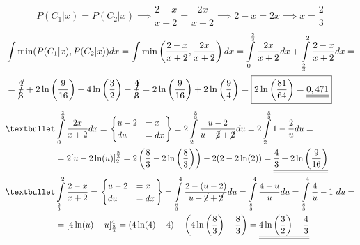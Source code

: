 \documentclass[a4paper]{article}
\begin{document}
$$
P(C_1|x) = P(C_2|x) \implies \frac{2 - x}{x + 2} = \frac{2x}{x + 2} \implies
2 - x = 2x \implies \boxed{x = \frac{2}{3}}
$$
\begin{align*}
& \int \min(P(C_1|x),P(C_2|x)) dx = 
\int \min\left(\frac{2 - x}{x + 2},\frac{2x}{x + 2}\right) dx =
\int\limits_{0}^{\frac{2}{3}} \frac{2x}{x + 2} dx + 
\int\limits_{\frac{2}{3}}^{2} \frac{2 - x}{x + 2} dx = \\
& = \cancel{\frac{4}{3}} + 2\ln\left(\frac{9}{16}\right) + 
4\ln\left(\frac{3}{2} \right) - \cancel{\frac{4}{3}} = 
2\ln\left(\frac{9}{16}\right) + 2\ln\left( \frac{9}{4} \right) =
\boxed{2\ln\left(\frac{81}{64}\right) = \underline{\underline{0,471}}}
\end{align*}
\begin{align*}
\textbullet 
&\int\limits_{0}^{\frac{2}{3}} \frac{2x}{x + 2} dx =
\begin{rcases}
\begin{cases}
u - 2 &= x  \\
du &= dx
\end{cases}
\end{rcases} =
2 \int\limits_{2}^{\frac{8}{3}} \frac{u - 2}{u - \cancel{2} + \cancel{2}} du = 
2 \int\limits_{2}^{\frac{8}{3}}  1 -\frac{2}{u} du = \\
&= 2 [u - 2\ln(u)]_2^{\frac{8}{3}} = 
2 \left( \frac{8}{3} - 2\ln\left( \frac{8}{3} \right) \right) - 2 (2 - 2\ln(2)) =
\underline{\underline{\frac{4}{3} + 2\ln\left(\frac{9}{16}\right)}} \\
\textbullet & 
\int\limits_{\frac{2}{3}}^{2} \frac{2 - x}{x + 2} = 
\begin{rcases}
\begin{cases}
u - 2 &= x  \\
du &= dx
\end{cases}
\end{rcases} =
\int\limits_{\frac{8}{3}}^4 \frac{2 - (u - 2)}{u - \cancel{2} + \cancel{2}} du =
\int\limits_{\frac{8}{3}}^4 \frac{4 - u}{u} du =
\int\limits_{\frac{8}{3}}^4 \frac{4}{u} - 1 \ du = \\
&= [4\ln(u) - u]_{\frac{8}{3}}^4 = 
(4\ln(4) - 4) - \left( 4\ln\left( \frac{8}{3}\right) - \frac{8}{3} \right) =
\underline{\underline{4\ln\left(\frac{3}{2} \right)- \frac{4}{3}}}
\end{align*}
\end{document}
